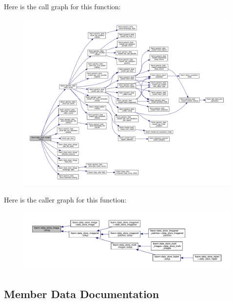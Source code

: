 Here is the call graph for this function\+:\nopagebreak
\begin{figure}[H]
\begin{center}
\leavevmode
\includegraphics[width=350pt]{classlbann_1_1data__store__image_a79280b3aa9a207dfacad2bcc9824ec73_cgraph}
\end{center}
\end{figure}
Here is the caller graph for this function\+:\nopagebreak
\begin{figure}[H]
\begin{center}
\leavevmode
\includegraphics[width=350pt]{classlbann_1_1data__store__image_a79280b3aa9a207dfacad2bcc9824ec73_icgraph}
\end{center}
\end{figure}


\subsection{Member Data Documentation}
\mbox{\label{classlbann_1_1data__store__image_a10e9aa0c240785bc0a961f24e87a1c16}} 
